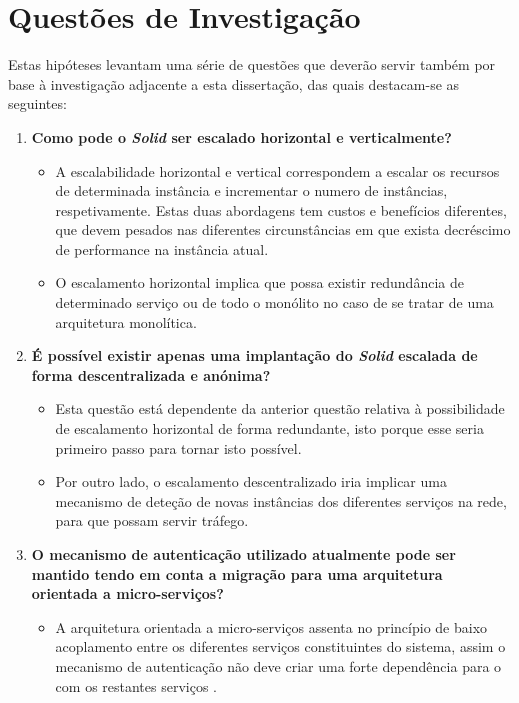\section{Questões de Investigação \label{section_investigation_questions}}
Estas hipóteses levantam uma série de questões que deverão servir também por base à investigação adjacente a esta dissertação, das quais destacam-se as seguintes:
\begin{enumerate}
    \item \textbf{Como pode o \emph{Solid} ser escalado horizontal e verticalmente?}
    \begin{itemize}
        \item A escalabilidade horizontal e vertical correspondem a escalar os recursos de determinada instância e incrementar o numero de instâncias, respetivamente. Estas duas abordagens tem custos e benefícios diferentes, que devem pesados nas diferentes circunstâncias em que exista decréscimo de performance na instância atual.
        \item O escalamento horizontal implica que possa existir redundância de determinado serviço ou de todo o monólito no caso de se tratar de uma arquitetura monolítica.
    \end{itemize}
    \item \textbf{É possível existir apenas uma implantação do \emph{Solid} escalada de forma descentralizada e anónima?}
    \begin{itemize}
        \item Esta questão está dependente da anterior questão relativa à possibilidade de escalamento horizontal de forma redundante, isto porque esse seria primeiro passo para tornar isto possível.
        \item Por outro lado, o escalamento descentralizado iria implicar uma mecanismo de deteção de novas instâncias dos diferentes serviços na rede, para que possam servir tráfego.
    \end{itemize}
    \item \textbf{O mecanismo de autenticação utilizado atualmente pode ser mantido tendo em conta a migração para uma arquitetura orientada a micro-serviços?}
    \begin{itemize}
        \item A arquitetura orientada a micro-serviços assenta no princípio de baixo acoplamento entre os diferentes serviços constituintes do sistema, assim o mecanismo de autenticação não deve criar uma forte dependência para o com os restantes serviços \cite{building_microservices:2015}.
    \end{itemize}
\end{enumerate}

